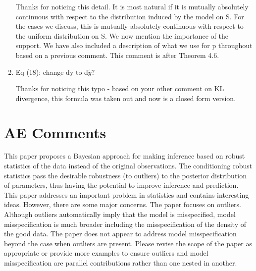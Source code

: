 \documentclass{article}
\newcommand{\response}[1]{{\color{blue}#1}}
\begin{document}
\begin{enumerate}
\response{Thanks for noticing this detail. It is most natural if it is mutually absolutely continuous with respect to the distribution induced by the model on S.  For the cases we discuss, this is mutually absolutely continuous with respect to the uniform distribution on S.  We now mention the importance of the support.  We have also included a description of what we use for p throughout based on a previous comment. This comment is after Theorem 4.6.}

\item  Eq (18): change dy to d$\tilde{y}$?

\response{Thanks for noticing this typo - based on your other comment on KL divergence, this formula was taken out and now is a closed form version. }

\end{enumerate}

\section{AE Comments}
This paper proposes a Bayesian approach for making inference based on robust statistics of the data instead of the original observations. The conditioning robust statistics pass the desirable robustness (to outliers) to the posterior distribution of parameters, thus having the potential to improve inference and prediction. This paper addresses an important problem in statistics and contains interesting ideas. However, there are some major concerns.
The paper focuses on outliers. Although outliers automatically imply that the model is misspecified, model misspecification is much broader including the misspecification of the density of the good data. The paper does not appear to address model misspecification beyond the case when outliers are present. Please revise the scope of the paper as appropriate or provide more examples to ensure outliers and model misspecification are parallel contributions rather than one nested in another. 
\end{document}

